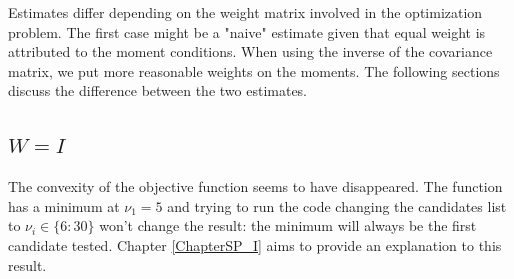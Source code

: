 Estimates differ depending on the weight matrix involved in the optimization problem. The first case might be a "naive" estimate given that equal weight is attributed to the moment conditions.  When using the inverse of the covariance matrix, we put more reasonable weights on the moments. The following sections discuss the difference between the two estimates.


\subsection{$W=I$}\label{SectionCriterionSP500_I}
The convexity of the objective function seems to have disappeared. The function has a minimum at $\nu_1=5$ and trying to run the code changing the candidates list to $\nu_i \in \{6:30\}$ won't change the result: the minimum will always be the first candidate tested. Chapter \ref{ChapterSP_I} aims to provide an explanation to this result.

